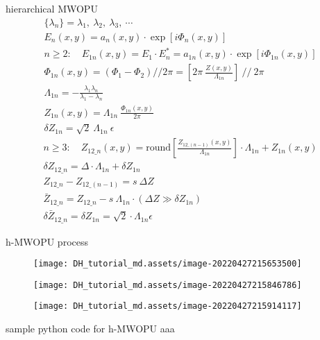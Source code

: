 \documentclass[t, aspectratio=169]{beamer}
\begin{document}
\begin{frame}[allowframebreaks]{hierarchical MWOPU}
	\begin{gather*}
\{\lambda_n\} = \lambda_1,\ \lambda_2,\ \lambda_3,\ \cdots \\
E_n(x,y) = a_n(x,y)\cdot\exp[i\Phi_n(x,y)] \\
n \ge 2:\quad E_{1n}(x,y) = E_1\cdot E_n^* = a_{1n}(x,y)\cdot\exp[i\Phi_{1n}(x,y)] \\
\Phi_{1n}(x,y) = (\Phi_1 - \Phi_2)//2\pi = \left[ 2\pi\ \frac{Z(x,y)}{\Lambda_{1n}} \right]\ //\ 2\pi \\
\Lambda_{1n} = -\frac{\lambda_1\lambda_n}{\lambda_1 - \lambda_n} \\
Z_{1n}(x,y) = \Lambda_{1n}\ \frac{\Phi_{1n}(x,y)}{2\pi} \\
\delta Z_{1n} = \sqrt{2}\ \Lambda_{1n}\ \epsilon 
	\end{gather*}
	\begin{gather*}
n \ge 3:\quad Z_{12\_n}(x,y) = \textrm{round}\left[\frac{Z_{12\_(n-1)}(x,y)}{\Lambda_{1n}} \right]\cdot\Lambda_{1n} + Z_{1n}(x,y) \\
\delta Z_{12\_n} = \Delta\cdot\Lambda_{1n} + \delta Z_{1n} \\
Z_{12\_n} - Z_{12\_(n-1)} = s\ \Delta Z \\
\bar{Z}_{12\_n} = Z_{12\_n} - s\ \Lambda_{1n}\cdot(\Delta Z \gg \delta Z_{1n}) \\
\delta\bar{Z}_{12\_n} = \delta Z_{1n} = \sqrt{2}\cdot\Lambda_{1n}\epsilon
	\end{gather*}
\end{frame}


\begin{frame}[allowframebreaks]{h-MWOPU process}
	\begin{figure}
		\texttt{[image: DH\_tutorial\_md.assets/image-20220427215653500]}
	\end{figure}
	\begin{figure}
		\texttt{[image: DH\_tutorial\_md.assets/image-20220427215846786]}
	\end{figure}
	\begin{figure}
		\texttt{[image: DH\_tutorial\_md.assets/image-20220427215914117]}
	\end{figure}
\end{frame}


\begin{frame}{sample python code for h-MWOPU}
aaa
\end{frame}
\end{document}
